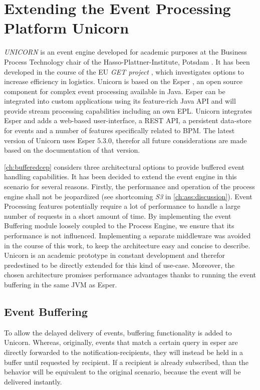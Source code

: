 \section{Extending the Event Processing Platform Unicorn}\label{ch:implunicorn}
\textit{UNICORN} is an event engine developed for academic purposes at the Business Process Technology chair of the Hasso-Plattner-Institute, Potsdam \cite{unicornhome, baumgrass2015get}.
It has been developed in the course of the EU \textit{GET project} \cite{getservicehome}, which investigates options to increase efficiency in logistics.
Unicorn is based on the Esper \cite{esperhome}, an open source component for complex event processing available in Java.
Esper can be integrated into custom applications using its feature-rich Java API and will provide stream processing capabilities including an own \acf{EPL}.
Unicorn integrates Esper and adds a web-based user-interface, a REST API, a persistent data-store for events and a number of features specifically related to BPM.
The latest version of Unicorn uses Esper $5.3.0$, therefor all future considerations are made based on the documentation of that version.

\autoref{ch:bufferedcep} considers three architectural options to provide buffered event handling capabilities.
It has been decided to extend the event engine in this scenario for several reasons.
Firstly, the performance and operation of the process engine shall not be jeopardized (see shortcoming \textit{S3} in \autoref{ch:ass:discussion}). Event Processing features potentially require a lot of performance to handle a large number of requests in a short amount of time.
By implementing the event Buffering module loosely coupled to the Process Engine, we ensure that its performance is not influenced.
Implementing a separate middleware was avoided in the course of this work, to keep the architecture easy and concise to describe.
Unicorn is an academic prototype in constant development and therefor predestined to be directly extended for this kind of use-case.
Moreover, the chosen architecture promises performance advantages thanks to running the event buffering in the same \acs{JVM} as Esper.


\subsection{Event Buffering}
To allow the delayed delivery of events, buffering functionality is added to Unicorn.
Whereas, originally, events that match a certain query in esper are directly forwarded to the notification-recipients, they will instead be held in a buffer until requested by recipient. 
If a recipient is already subscribed, than the behavior will be equivalent to the original scenario, because the event will be delivered instantly.


